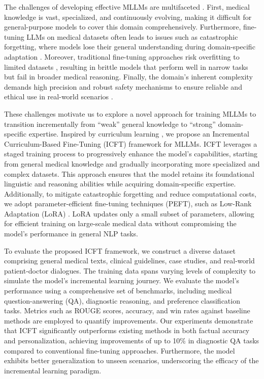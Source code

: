 The challenges of developing effective MLLMs are multifaceted \cite{zhou2024rethinking,zhou2024visual}. First, medical knowledge is vast, specialized, and continuously evolving, making it difficult for general-purpose models to cover this domain comprehensively. Furthermore, fine-tuning LLMs on medical datasets often leads to issues such as catastrophic forgetting, where models lose their general understanding during domain-specific adaptation \cite{alnazi2023review}. Moreover, traditional fine-tuning approaches risk overfitting to limited datasets \cite{wang2024insectmamba}, resulting in brittle models that perform well in narrow tasks but fail in broader medical reasoning. Finally, the domain's inherent complexity demands high precision and robust safety mechanisms to ensure reliable and ethical use in real-world scenarios \cite{taylor2024embedding}.

These challenges motivate us to explore a novel approach for training MLLMs to transition incrementally from ``weak'' general knowledge to ``strong'' domain-specific expertise. Inspired by curriculum learning \cite{mumtaz2023applications}, we propose an Incremental Curriculum-Based Fine-Tuning (ICFT) framework for MLLMs. ICFT leverages a staged training process to progressively enhance the model's capabilities, starting from general medical knowledge and gradually incorporating more specialized and complex datasets. This approach ensures that the model retains its foundational linguistic and reasoning abilities while acquiring domain-specific expertise. Additionally, to mitigate catastrophic forgetting and reduce computational costs, we adopt parameter-efficient fine-tuning techniques (PEFT), such as Low-Rank Adaptation (LoRA) \cite{taylor2024embedding}. LoRA updates only a small subset of parameters, allowing for efficient training on large-scale medical data without compromising the model's performance in general NLP tasks.

To evaluate the proposed ICFT framework, we construct a diverse dataset comprising general medical texts, clinical guidelines, case studies, and real-world patient-doctor dialogues. The training data spans varying levels of complexity to simulate the model's incremental learning journey. We evaluate the model's performance using a comprehensive set of benchmarks, including medical question-answering (QA), diagnostic reasoning, and preference classification tasks. Metrics such as ROUGE scores, accuracy, and win rates against baseline methods are employed to quantify improvements. Our experiments demonstrate that ICFT significantly outperforms existing methods in both factual accuracy and personalization, achieving improvements of up to 10\% in diagnostic QA tasks compared to conventional fine-tuning approaches. Furthermore, the model exhibits better generalization to unseen scenarios, underscoring the efficacy of the incremental learning paradigm.

